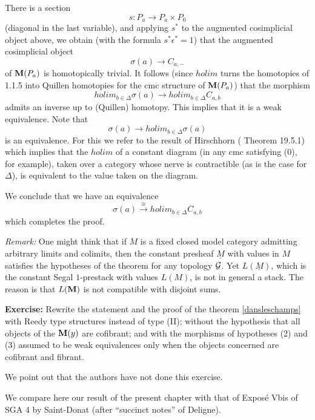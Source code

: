 There is a section
$$
s:P_a\rightarrow P_a\times P_0
$$
(diagonal in the last variable), and applying $s^{\ast}$ to the augmented
cosimplicial object above, we obtain (with the formula
$s^{\ast} \epsilon ^{\ast} = 1$) that
the augmented cosimplicial object
$$
\sigma (a) \rightarrow C_{a,-}
$$
of ${\bf M} (P_a)$ is homotopically trivial.
It follows (since $holim$ turns the homotopies of \cite{Illusie} 1.1.5
into Quillen homotopies \cite{Quillen} for the cmc structure of ${\bf M}
(P_a)$) that the morphism
$$
holim _{b\in \Delta}\sigma (a)\rightarrow  holim _{b\in \Delta}
C_{a,b}
$$
admits an inverse up to (Quillen) homotopy. This implies
that it is a weak equivalence. Note that
$$
\sigma (a)\rightarrow holim _{b\in \Delta}\sigma (a)
$$
is an equivalence. For this we refer to the result of Hirschhorn
(\cite{Hirschhorn}
Theorem 19.5.1) which implies that the $holim$ of a constant diagram (in
any cmc satisfying (0), for example), taken over a category
whose nerve is contractible (as is the case for $\Delta$), is equivalent
to the value taken on the diagram.

We conclude that we have an equivalence
$$
\sigma (a)\stackrel{\cong}{\rightarrow} holim _{b\in \Delta}
C_{a,b}
$$
which completes the proof.
\eop

{\em Remark:}
One might think that if $M$ is a fixed closed model category
admitting arbitrary limits and colimits, then the constant presheaf
$\underline{M}$ with values in $M$ satisfies the hypotheses of the
theorem for any topology ${\cal G}$. Yet $L(\underline{M})$, which is
the constant Segal $1$-prestack with values $L(M)$, is not in general
a stack. The reason is that $L({\bf M} )$ is not compatible with disjoint
sums.

{\bf Exercise:} Rewrite the statement and the proof of the theorem
\ref{dansleschamps} with Reedy type structures instead of type (II);
without the hypothesis that all objects of the ${\bf M} (y)$ are cofibrant; and
with the morphisms
of hypotheses (2) and (3) assumed to be
weak equivalences only
when the objects concerned are cofibrant and fibrant.

We point out that the authors have not done this exercise.

We compare here our result of the present chapter with that of
Exposé Vbis of SGA 4 \cite{SGA4b} by Saint-Donat (after ``succinct
notes'' of Deligne).


